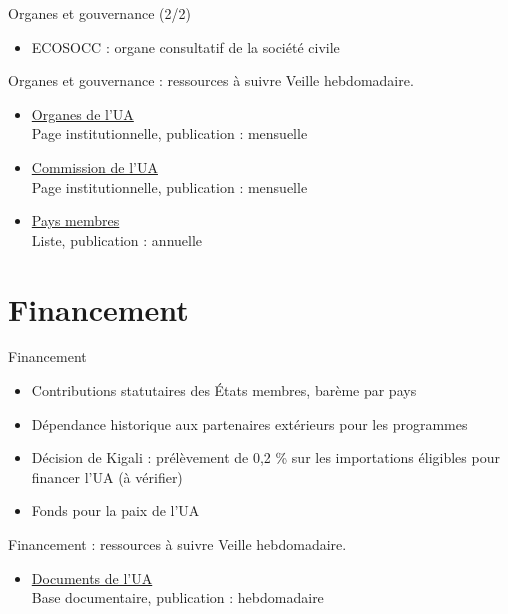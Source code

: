 \documentclass[aspectratio=169,11pt]{beamer}
\begin{document}
\begin{frame}{Organes et gouvernance (2/2)}
\begin{itemize}
\item ECOSOCC : organe consultatif de la société civile
\end{itemize}
\end{frame}

\begin{frame}{Organes et gouvernance : ressources à suivre}
\small
Veille hebdomadaire.
\begin{itemize}
\item \href{https://au.int/en/organs}{Organes de l'UA}\\{\footnotesize Page institutionnelle, publication : mensuelle}
\item \href{https://au.int/en/commission}{Commission de l'UA}\\{\footnotesize Page institutionnelle, publication : mensuelle}
\item \href{https://au.int/en/member_states/countryprofiles2}{Pays membres}\\{\footnotesize Liste, publication : annuelle}
\end{itemize}
\end{frame}

\section{Financement}
\begin{frame}{Financement}
\begin{itemize}
\item Contributions statutaires des États membres, barème par pays
\item Dépendance historique aux partenaires extérieurs pour les programmes
\item Décision de Kigali : prélèvement de 0,2 \% sur les importations éligibles pour financer l'UA (à vérifier)
\item Fonds pour la paix de l'UA
\end{itemize}
\end{frame}

\begin{frame}{Financement : ressources à suivre}
\small
Veille hebdomadaire.
\begin{itemize}
\item \href{https://au.int/en/documents}{Documents de l'UA}\\{\footnotesize Base documentaire, publication : hebdomadaire}
\end{itemize}
\end{frame}
\end{document}
